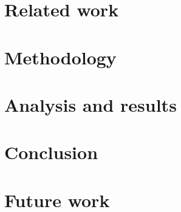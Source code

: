 \documentclass[12pt]{report}
\begin{document}
\section{Related work}

\section{Methodology}

\section{Analysis and results}

\section{Conclusion}

\section{Future work}

{}

\end{document}
